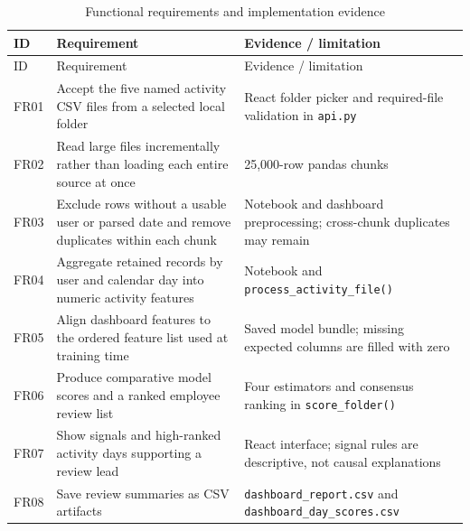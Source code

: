 \documentclass[12pt,a4paper,oneside]{report}
\begin{document}
\begin{longtable}{|p{}|p{}|p{}|}
\caption{Functional requirements and implementation evidence}
\label{tab:functional-requirements}\\
\hline
ID & Requirement & Evidence / limitation\\
\hline
\endfirsthead
\hline
ID & Requirement & Evidence / limitation\\
\hline
\endhead
FR01 & Accept the five named activity CSV files from a selected local folder & React folder picker and required-file validation in \texttt{api.py}\\
\hline
FR02 & Read large files incrementally rather than loading each entire source at once & 25,000-row pandas chunks\\
\hline
FR03 & Exclude rows without a usable user or parsed date and remove duplicates within each chunk & Notebook and dashboard preprocessing; cross-chunk duplicates may remain\\
\hline
FR04 & Aggregate retained records by user and calendar day into numeric activity features & Notebook and \texttt{process\_activity\_file()}\\
\hline
FR05 & Align dashboard features to the ordered feature list used at training time & Saved model bundle; missing expected columns are filled with zero\\
\hline
FR06 & Produce comparative model scores and a ranked employee review list & Four estimators and consensus ranking in \texttt{score\_folder()}\\
\hline
FR07 & Show signals and high-ranked activity days supporting a review lead & React interface; signal rules are descriptive, not causal explanations\\
\hline
FR08 & Save review summaries as CSV artifacts & \texttt{dashboard\_report.csv} and \texttt{dashboard\_day\_scores.csv}\\
\hline
\end{longtable}
\end{document}
